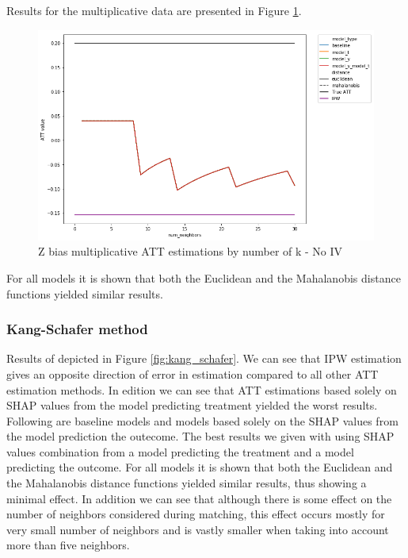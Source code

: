 \documentclass{article}
\begin{document}
Results for the multiplicative data are presented in Figure \ref{fig:z_bias_multi_no_alpha2}.

\begin{figure}[H]
    \centering
    \includegraphics[width=\textwidth]{Paper/images/z_bias_multiplicative_ATT_estimations_by_k_neighbors_no_alpha2.png}
    \caption{Z bias multiplicative ATT estimations by number of k - No IV}
    \label{fig:z_bias_multi_no_alpha2}
\end{figure}

For all models it is shown that both the Euclidean and the Mahalanobis distance functions yielded similar results.




\subsubsection{Kang-Schafer method}
Results of depicted in Figure \ref{fig:kang_schafer}. 
We can see that IPW estimation gives an opposite direction of error in estimation compared to all other ATT estimation methods. In edition we can see that ATT estimations based solely on SHAP values from the model predicting treatment yielded the worst results. 
Following are baseline models and models based solely on the SHAP values from the model prediction the outecome.
The best results we given with using SHAP values combination from a model
predicting the treatment and a model predicting the outcome.
For all models it is shown that both the Euclidean and the Mahalanobis
distance functions yielded similar results, thus showing a minimal effect.
In addition we can see that although there is some effect on the number of
neighbors considered during matching, this effect occurs mostly for very small
number of neighbors and is vastly smaller when taking into account more than
five neighbors.
\end{document}
